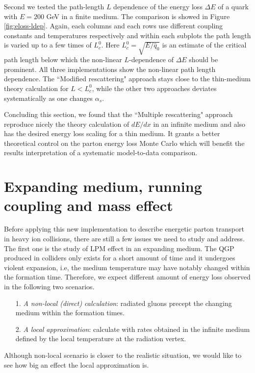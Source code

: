 \documentclass[aps, prc, reprint, amsmath, groupedaddress, nofootinbib]{revtex4-1}
\begin{document}
Second we tested the path-length $L$ dependence of the energy loss $\Delta E$ of a quark with $E = 200$ GeV in a finite medium.
The comparison is showed in Figure \ref{fig:eloss-ldep}.
Again, each columns and each rows use different coupling constants and temperatures respectively and within each subplots the path length is varied up to a few times of $L_c^0$.
Here $L_c^0 = \sqrt{E/\hat{q}_0}$ is an estimate of the critical path length below which the non-linear $L$-dependence of $\Delta E$ should be prominent.
All three implementations show the non-linear path length dependence.
The ``Modified rescattering" approach stays close to the thin-medium theory calculation for $L<L_c^0$, while the other two approaches deviates systematically as one changes $\alpha_s$.

Concluding this section, we found that the ``Multiple rescattering" approach reproduce nicely the theory calculation of $dE/dx$ in an infinite medium and also has the desired energy loss scaling for a thin medium.
It grants a better theoretical control on the parton energy loss Monte Carlo which will benefit the results interpretation of a systematic model-to-data comparison.

\section{Expanding medium, running coupling and mass effect}
Before applying this new implementation to describe energetic parton transport in heavy ion collisions, there are still a few issues we need to study and address.
The first one is the study of LPM effect in an expanding medium. 
The QGP produced in colliders only exists for a short amount of time and it undergoes violent expansion, i.e, the medium temperature may have notably changed within the formation time.
Therefore, we expect different amount of energy loss observed in the following two scenarios.
\begin{itemize}
\item[1.]  {\it A non-local (direct) calculation}: radiated gluons precept the changing medium within the formation times.
\item[2.] {\it A local approximation}: calculate with rates obtained in the infinite medium defined by the local temperature at the radiation vertex.
\end{itemize} 
Although non-local scenario is closer to the realistic situation, we would like to see how big an effect the local approximation is.
\end{document}
